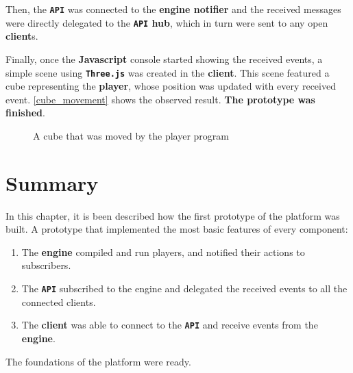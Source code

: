 \documentclass[a4paper,11pt,titlepage,abstract,numbers=noenddot,automark,mnsy,intlimits,rgb,dvipsnames]{report}
\begin{document}
Then, the \textbf{\texttt{API}} was connected to the \textbf{engine notifier} and the received messages were directly delegated to the \textbf{\texttt{API} hub},
which in turn were sent to any open \textbf{client}s.

Finally, once the \textbf{Javascript} console started showing the received events, a simple scene using \textbf{\texttt{Three.js}} was created in the
\textbf{client}. This scene featured a cube representing the \textbf{player}, whose position was updated with every received event.
\autoref{cube_movement} shows the observed result. \textbf{The prototype was finished}.
\begin{figure}[H]
\begin{center}
\noindent{}
\end{center}
\caption{A cube that was moved by the player program}
\label{cube_movement}
\end{figure}
\section{Summary}
In this chapter, it is been described how the first prototype of the platform was built. A prototype that implemented the
most basic features of every component:
\begin{enumerate}
\item
The \textbf{engine} compiled and run players, and notified their actions to subscribers.
\item
The \textbf{\texttt{API}} subscribed to the engine and delegated the received events to all the connected clients.
\item
The \textbf{client} was able to connect to the \textbf{\texttt{API}} and receive events from the \textbf{engine}.
\end{enumerate}
The foundations of the platform were ready.
\end{document}
